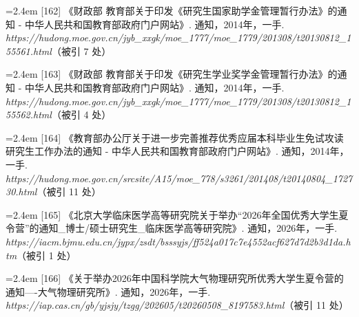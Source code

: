 {\nopagebreak\vspace{1pt}
\noindent\hangindent=2.4em \label{src:S0203}{\color{cAccent}[162]} 《财政部 教育部关于印发《研究生国家助学金管理暂行办法》的通知 - 中华人民共和国教育部政府门户网站》. 通知，2014年，一手. \textit{https://hudong.moe.gov.cn/jyb\_xxgk/moe\_1777/moe\_1779/201308/t20130812\_155561.html}（被引 7 处）\par
\vspace{0.6pt}
\noindent\hangindent=2.4em \label{src:S0204}{\color{cAccent}[163]} 《财政部 教育部关于印发《研究生学业奖学金管理暂行办法》的通知 - 中华人民共和国教育部政府门户网站》. 通知，2014年，一手. \textit{https://hudong.moe.gov.cn/jyb\_xxgk/moe\_1777/moe\_1779/201308/t20130812\_155562.html}（被引 4 处）\par
\vspace{0.6pt}
\noindent\hangindent=2.4em \label{src:S0205}{\color{cAccent}[164]} 《教育部办公厅关于进一步完善推荐优秀应届本科毕业生免试攻读研究生工作办法的通知 - 中华人民共和国教育部政府门户网站》. 通知，2014年，一手. \textit{https://hudong.moe.gov.cn/srcsite/A15/moe\_778/s3261/201408/t20140804\_172730.html}（被引 11 处）\par
\vspace{0.6pt}
\vspace{3.5pt}\par
\nopagebreak\vspace{1pt}
\noindent\hangindent=2.4em \label{src:S0207}{\color{cAccent}[165]} 《北京大学临床医学高等研究院关于举办“2026年全国优秀大学生夏令营”的通知\_博士/硕士研究生\_临床医学高等研究院》. 通知，2026年，一手. \textit{https://iacm.bjmu.edu.cn/jypx/zsdt/bsssyjs/ff524a017c7e4552acf627d7d2b3d1da.htm}（被引 1 处）\par
\vspace{0.6pt}
\vspace{3.5pt}\par
\nopagebreak\vspace{1pt}
\noindent\hangindent=2.4em \label{src:S0208}{\color{cAccent}[166]} 《关于举办2026年中国科学院大气物理研究所优秀大学生夏令营的通知----大气物理研究所》. 通知，2026年，一手. \textit{https://iap.cas.cn/gb/yjsjy/tzgg/202605/t20260508\_8197583.html}（被引 11 处）\par
\vspace{0.6pt}
\vspace{3.5pt}\par
}
